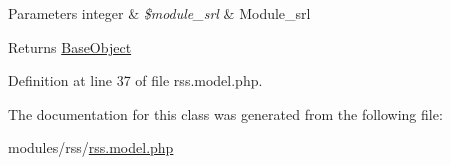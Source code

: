 \begin{DoxyParams}[1]{Parameters}
integer & {\em \$module\-\_\-srl} & Module\-\_\-srl \\
\hline
\end{DoxyParams}
\begin{DoxyReturn}{Returns}
\hyperlink{classBaseObject}{Base\-Object} 
\end{DoxyReturn}


Definition at line 37 of file rss.\-model.\-php.



The documentation for this class was generated from the following file\-:\begin{DoxyCompactItemize}
\item 
modules/rss/\hyperlink{rss_8model_8php}{rss.\-model.\-php}\end{DoxyCompactItemize}
